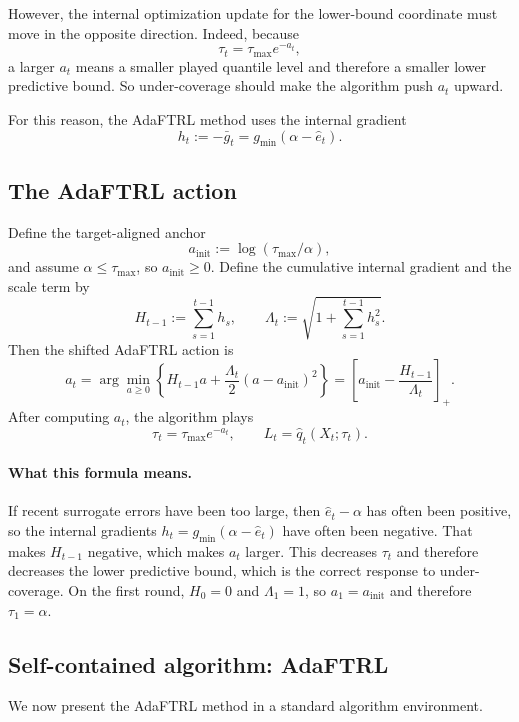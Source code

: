 \documentclass[11pt]{article}
\newcommand{\1}{\mathbf{1}}
\begin{document}
However, the internal optimization update for the lower-bound coordinate must move in the opposite direction. Indeed, because
\[
\tau_t=\tau_{\max}e^{-a_t},
\]
a larger \(a_t\) means a smaller played quantile level and therefore a smaller lower predictive bound. So under-coverage should make the algorithm push \(a_t\) upward.

For this reason, the AdaFTRL method uses the internal gradient
\[
h_t:=-\bar g_t=g_{\min}(\alpha-\hat e_t).
\]

\subsection{The AdaFTRL action}

Define the target-aligned anchor
\[
a_{\mathrm{init}}:=\log(\tau_{\max}/\alpha),
\]
and assume \(\alpha\le \tau_{\max}\), so \(a_{\mathrm{init}}\ge 0\). Define the cumulative internal gradient and the scale term by
\[
H_{t-1}:=\sum_{s=1}^{t-1} h_s,
\qquad
\Lambda_t:=\sqrt{1+\sum_{s=1}^{t-1} h_s^2}.
\]
Then the shifted AdaFTRL action is
\[
a_t
=
\arg\min_{a\ge 0}
\left\{
H_{t-1}a+\frac{\Lambda_t}{2}(a-a_{\mathrm{init}})^2
\right\}
=
\left[a_{\mathrm{init}}-\frac{H_{t-1}}{\Lambda_t}\right]_+.
\]
After computing \(a_t\), the algorithm plays
\[
\tau_t=\tau_{\max}e^{-a_t},
\qquad
L_t=\hat q_t(X_t;\tau_t).
\]

\paragraph{What this formula means.}
If recent surrogate errors have been too large, then \(\hat e_t-\alpha\) has often been positive, so the internal gradients \(h_t=g_{\min}(\alpha-\hat e_t)\) have often been negative. That makes \(H_{t-1}\) negative, which makes \(a_t\) larger. This decreases \(\tau_t\) and therefore decreases the lower predictive bound, which is the correct response to under-coverage. On the first round, \(H_0=0\) and \(\Lambda_1=1\), so \(a_1=a_{\mathrm{init}}\) and therefore \(\tau_1=\alpha\).



\subsection{Self-contained algorithm: AdaFTRL}

We now present the AdaFTRL method in a standard algorithm environment.
\end{document}
